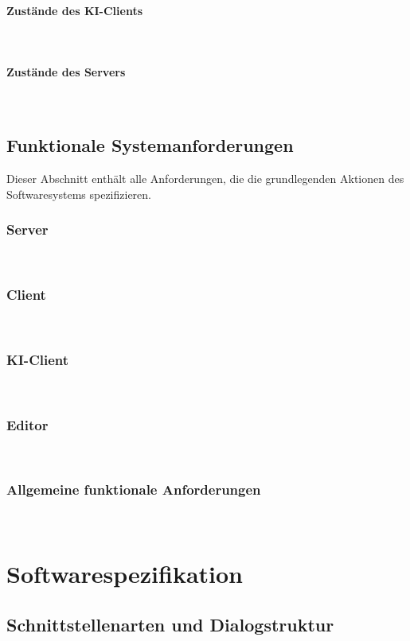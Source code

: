 \documentclass{uulm-assignment}
\begin{document}
\paragraph{Zustände des KI-Clients} \mbox{}\\

\clearpage
\paragraph{Zustände des Servers} \mbox{}\\


\clearpage
\subsection{Funktionale Systemanforderungen}
Dieser Abschnitt enthält alle Anforderungen, die die grundlegenden Aktionen des Softwaresystems spezifizieren.
\subsubsection{Server} \mbox{}\\

\subsubsection{Client} \mbox{}\\

\subsubsection{KI-Client} \mbox{}\\

\subsubsection{Editor} \mbox{}\\

\subsubsection{Allgemeine funktionale Anforderungen} \mbox{}\\


\clearpage
\section{Softwarespezifikation}
\subsection{Schnittstellenarten und Dialogstruktur}
\end{document}
